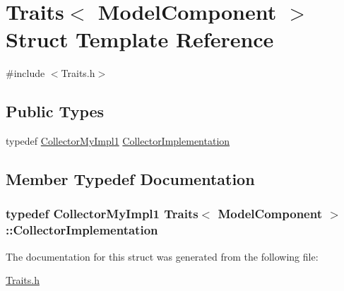 \hypertarget{struct_traits_3_01_model_component_01_4}{\section{Traits$<$ Model\-Component $>$ Struct Template Reference}
\label{struct_traits_3_01_model_component_01_4}
}


{\ttfamily \#include $<$Traits.\-h$>$}

\subsection*{Public Types}
\begin{DoxyCompactItemize}
\item 
typedef \hyperlink{class_collector_my_impl1}{Collector\-My\-Impl1} \hyperlink{struct_traits_3_01_model_component_01_4_aea662c7138c7186aa5d60a6912d0010a}{Collector\-Implementation}
\end{DoxyCompactItemize}


\subsection{Member Typedef Documentation}
\hypertarget{struct_traits_3_01_model_component_01_4_aea662c7138c7186aa5d60a6912d0010a}{
\subsubsection[{Collector\-Implementation}]{\setlength{\rightskip}{0pt plus 5cm}typedef {\bf Collector\-My\-Impl1} {\bf Traits}$<$ {\bf Model\-Component} $>$\-::{\bf Collector\-Implementation}}}\label{struct_traits_3_01_model_component_01_4_aea662c7138c7186aa5d60a6912d0010a}


The documentation for this struct was generated from the following file\-:\begin{DoxyCompactItemize}
\item 
\hyperlink{_traits_8h}{Traits.\-h}\end{DoxyCompactItemize}
